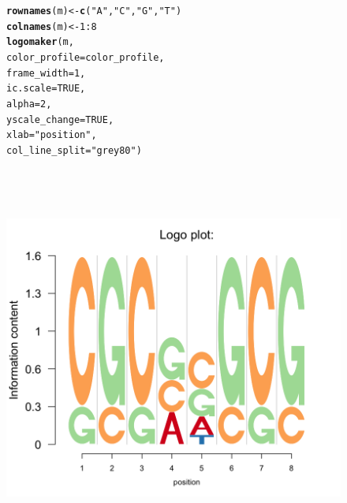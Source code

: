 \documentclass[12pt]{article}\usepackage[]{graphicx}\usepackage[usenames,dvipsnames]{color}
\makeatletter
\newcommand{\hlnum}[1]{\textcolor[rgb]{0.686,0.059,0.569}{#1}}%
\newcommand{\hlstr}[1]{\textcolor[rgb]{0.192,0.494,0.8}{#1}}%
\newcommand{\hlopt}[1]{\textcolor[rgb]{0,0,0}{#1}}%
\newcommand{\hlstd}[1]{\textcolor[rgb]{0.345,0.345,0.345}{#1}}%
\newcommand{\hlkwb}[1]{\textcolor[rgb]{0.69,0.353,0.396}{#1}}%
\newcommand{\hlkwc}[1]{\textcolor[rgb]{0.333,0.667,0.333}{#1}}%
\newcommand{\hlkwd}[1]{\textcolor[rgb]{0.737,0.353,0.396}{\textbf{#1}}}%
\newenvironment{kframe}{%
 \def\at@end@of@kframe{}%
 \ifinner\ifhmode%
  \def\at@end@of@kframe{\end{minipage}}%
  \begin{minipage}{\columnwidth}%
 \fi\fi%
 \def\FrameCommand##1{\hskip\@totalleftmargin \hskip-\fboxsep
 \colorbox{shadecolor}{##1}\hskip-\fboxsep
     \hskip-\linewidth \hskip-\@totalleftmargin \hskip\columnwidth}%
 \MakeFramed {\advance\hsize-\width
   \@totalleftmargin\z@ \linewidth\hsize
   \@setminipage}}%
 {\par\unskip\endMakeFramed%
 \at@end@of@kframe}
\newenvironment{knitrout}{}{} %
\makeatother
\begin{document}
\begin{figure}[h]
\begin{center}
\begin{knitrout}
\color{fgcolor}\begin{kframe}
\begin{alltt}
\hlkwd{rownames}\hlstd{(m)} \hlkwb{<-} \hlkwd{c}\hlstd{(}\hlstr{"A"}\hlstd{,} \hlstr{"C"}\hlstd{,} \hlstr{"G"}\hlstd{,} \hlstr{"T"}\hlstd{)}
\hlkwd{colnames}\hlstd{(m)} \hlkwb{<-} \hlnum{1}\hlopt{:}\hlnum{8}
\hlkwd{logomaker}\hlstd{(m,}
          \hlkwc{color_profile} \hlstd{= color_profile,}
          \hlkwc{frame_width} \hlstd{=} \hlnum{1}\hlstd{,}
          \hlkwc{ic.scale} \hlstd{=} \hlnum{TRUE}\hlstd{,}
          \hlkwc{alpha} \hlstd{=} \hlnum{2}\hlstd{,}
          \hlkwc{yscale_change}\hlstd{=}\hlnum{TRUE}\hlstd{,}
          \hlkwc{xlab}\hlstd{=}\hlstr{"position"}\hlstd{,}
          \hlkwc{col_line_split} \hlstd{=} \hlstr{"grey80"}\hlstd{)}
\end{alltt}
\end{kframe}
\includegraphics[width=6in,height=5in]{figure/logolas_use_2-1} 

\end{knitrout}
\end{center}
\end{figure}


\newpage
\end{document}
